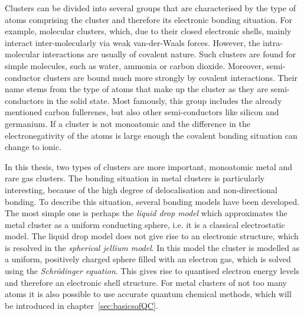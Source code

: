 Clusters can be divided into several groups that are characterised by the type
of atoms comprising the cluster and therefore its electronic bonding situation.
For example, molecular clusters, which, due to their closed electronic shells,
mainly interact inter-molecularly via weak van-der-Waals forces. However, the
intra-molecular interactions are usually of covalent nature. Such clusters are
found for simple molecules, such as water,\autocite{Liu_WaterClusters_1996}
ammonia\autocite{Beu_Structureammoniaclusters_2001} or carbon
dioxide.\autocite{Takeuchi_GeometryOptimizationCarbon_2008} Moreover,
semi-conductor clusters are bound much more strongly by covalent interactions.
Their name stems from the type of atoms that make up the cluster as they are
semi-conductors in the solid state. Most famously, this group includes the
already mentioned carbon
fullerenes\autocite{Kroto_C60Buckminsterfullerene_1985}, but also other
semi-conductors like silicon\autocite{Zhu_Structuresstabilitiessmall_2003a} and
germanium.\autocite{Pacchioni_Silicongermaniumclusters_1986} If a cluster is not
monoatomic and the difference in the electronegativity of the atoms is large
enough the covalent bonding situation can change to ionic.

In this thesis, two types of clusters are more important, monoatomic metal and
rare gas clusters. The bonding situation in metal clusters is particularly
interesting, because of the high degree of delocalisation and non-directional
bonding. To describe this situation, several bonding models have been developed.
The most simple one is perhaps the \emph{liquid drop model} which approximates
the metal cluster as a uniform conducting sphere, i.e. it is a classical
electrostatic model. The liquid drop model does not give rise to an electronic
structure, which is resolved in the \textit{spherical jellium model}. In this
model the cluster is modelled as a uniform, positively charged sphere filled
with an electron gas, which is solved using the \textit{Schr\"odinger equation}.
This gives rise to quantised electron energy levels and therefore an electronic
shell structure. For metal clusters of not too many atoms it is also possible to
use accurate quantum chemical methods, which will be introduced in
chapter~\ref{sec:basicsofQC}.


